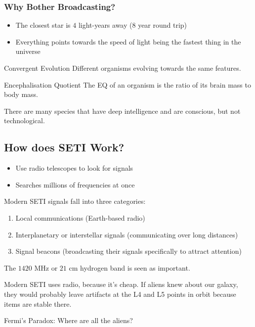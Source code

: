 \documentclass[class=article, crop=false]{standalone}
\begin{document}
  \subsubsection{Why Bother Broadcasting?}
  \begin{itemize}
    \item The closest star is $4$ light-years away (8 year round trip)
    \item Everything points towards the speed of light being the fastest thing in the universe
  \end{itemize}
  \begin{definition}{Convergent Evolution}
    Different organisms evolving towards the same features.
  \end{definition}
  \begin{definition}{Encephalisation Quotient}
    The EQ of an organism is the ratio of its brain mass to body mass.
  \end{definition}
  There are many species that have deep intelligence and are conscious, but not technological.
  \subsection{How does SETI Work?}
  \begin{itemize}
    \item Use radio telescopes to look for signals
    \item Searches millions of frequencies at once
  \end{itemize}
  Modern SETI signals fall into three categories:
  \begin{enumerate}
    \item Local communications (Earth-based radio)
    \item Interplanetary or interstellar signals (communicating over long distances)
    \item Signal beacons (broadcasting their signals specifically to attract attention)
  \end{enumerate}
  \begin{note}{}
    The $1420$ MHz or $21$ cm hydrogen band is seen as important.
  \end{note}
  Modern SETI uses radio, because it's cheap. If aliens knew about our galaxy, they would probably leave artifacts at the L4 and L5 points in orbit because items are stable there. \par
  Fermi's Paradox: Where are all the aliens?
\end{document}
